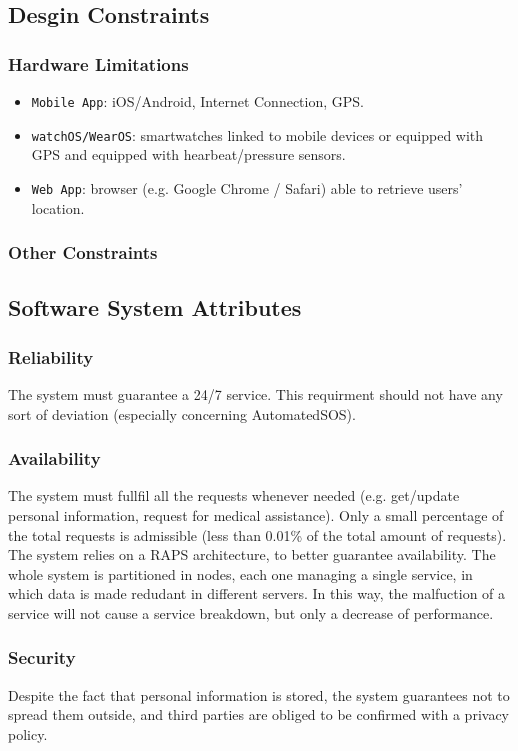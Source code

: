 \documentclass[12pt,a4paper]{article}
\begin{document}
	\subsection{Desgin Constraints}
	\subsubsection{Hardware Limitations}
		\begin{itemize}
			\item \texttt{Mobile App}: iOS/Android, Internet Connection, GPS.
			\item \texttt{watchOS/WearOS}: smartwatches linked to mobile devices or equipped with GPS and equipped with hearbeat/pressure sensors.
			\item \texttt{Web App}: browser (e.g. Google Chrome / Safari) able to retrieve users' location.
		\end{itemize}
	\subsubsection{Other Constraints}

	\subsection{Software System Attributes}
	\subsubsection{Reliability}
	The system must guarantee a 24/7 service. This requirment should not have any sort of deviation (especially concerning AutomatedSOS).
	\subsubsection{Availability}
	The system must fullfil all the requests whenever needed (e.g. get/update personal information, request for medical assistance). Only a small percentage of the total requests is admissible (less than 0.01\% of the total amount of requests). The system relies on a RAPS architecture, to better guarantee availability. The whole system is partitioned in nodes, each one managing a single service, in which data is made redudant in different servers. In this way, the malfuction of a service will not cause a service breakdown, but only a decrease of performance.
	\subsubsection{Security}
	Despite the fact that personal information is stored, the system guarantees not to spread them outside, and third parties are obliged to be confirmed with a privacy policy.
\end{document}
